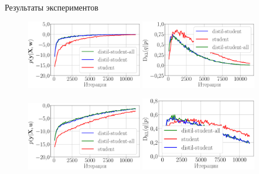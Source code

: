 \documentclass[10pt,pdf,hyperref={unicode}]{beamer}
\begin{document}
\begin{frame}{Результаты экспериментов}

\begin{figure}[h!]
\includegraphics[width=0.45\textwidth]{figures/synthetic_likelihood_3_layers.eps}
\includegraphics[width=0.45\textwidth]{figures/synthetic_D_KL_3_layers.eps}
\end{figure}

\begin{figure}[h!]
\includegraphics[width=0.45\textwidth]{figures/synthetic_likelihood_2_layers.eps}
\includegraphics[width=0.45\textwidth]{figures/synthetic_D_KL_2_layers.eps}
\end{figure}

\end{frame}
\end{document}
